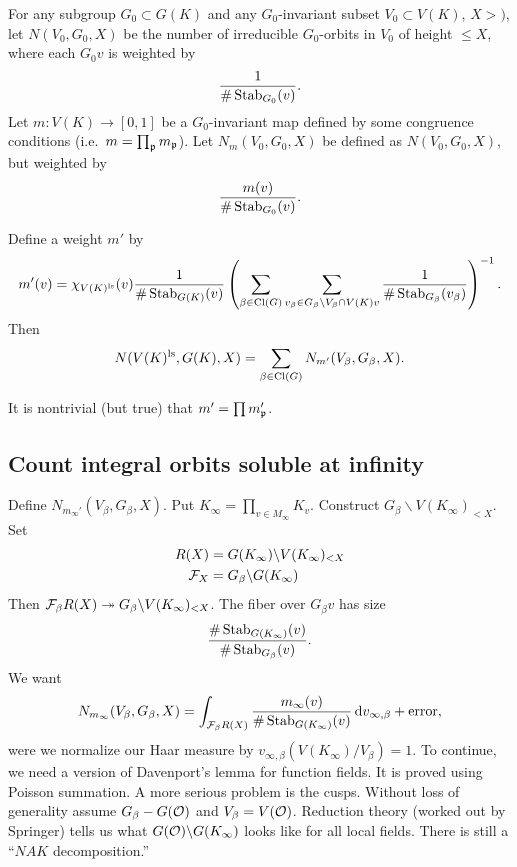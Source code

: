For any subgroup $G_0\subset G(K)$ and any $G_0$-invariant subset 
$V_0\subset V(K)$, $X>)$, let $N(V_0,G_0,X)$ be the number of irreducible 
$G_0$-orbits in $V_0$ of height $\leqslant X$, where each $G_0 v$ is weighted 
by 
\[
  \frac{1}{\#\operatorname{Stab}_{G_0}(v)} .
\]
Let $m:V(K)\to [0,1]$ be a $G_0$-invariant map defined by some congruence 
conditions (i.e.~$m=\prod_{\mathfrak{p}} m_{\mathfrak{p}}$). Let $N_m(V_0,G_0,X)$ be defined as 
$N(V_0,G_0,X)$, but weighted by 
\[
  \frac{m(v)}{\#\operatorname{Stab}_{G_0}(v)} .
\]

\begin{theo}
Define a weight $m'$ by 
\[
  m'(v)=\chi_{V(K)^\mathrm{ls}}(v) \frac{1}{\#\operatorname{Stab}_{G(K)}(v)}\left(\sum_{\beta\in \operatorname{Cl}(G)}\sum_{v_\beta\in G_\beta\backslash V_\beta\cap V(K)v} \frac{1}{\#\operatorname{Stab}_{G_\beta}(v_\beta)}\right)^{-1} .
\]
Then 
\[
  N(V(K)^\mathrm{ls},G(K),X) = \sum_{\beta\in \operatorname{Cl}(G)}N_{m'}(V_\beta,G_\beta,X) . 
\]
\end{theo}

It is nontrivial (but true) that $m' = \prod m'_{\mathfrak{p}}$. 





\subsection{Count integral orbits soluble at infinity}

Define $N_{m_\infty'}(V_\beta,G_\beta,X)$. Put 
$K_\infty = \prod_{v\in M_\infty} K_v$. Construct 
$G_\beta\backslash V(K_\infty)_{<X}$. Set 
\begin{align*}
  R(X) &= G(K_\infty) \backslash V(K_\infty)_{<X} \\
  \mathcal{F}_X &= G_\beta\backslash G(K_\infty) 
\end{align*}
Then $\mathcal{F}_\beta R(X)\twoheadrightarrow G_\beta\backslash V(K_\infty)_{<X}$. The 
fiber over $G_\beta v$ has size 
\[
  \frac{\#\operatorname{Stab}_{G(K_\infty)}(v)}{\#\operatorname{Stab}_{G_\beta}(v)} .
\]
We want 
\[
  N_{m_\infty}(V_\beta,G_\beta,X) = \int_{\mathcal{F}_\beta R(X)} \frac{m_\infty(v)}{\#\operatorname{Stab}_{G(K_\infty)}(v)}\,\mathrm{d} v_{\infty,\beta} + \text{error} ,
\]
were we normalize our Haar measure by 
$v_{\infty,\beta}(V(K_\infty)/V_\beta)=1$. 
To continue, we need a version of Davenport's lemma for function fields. It is 
proved using Poisson summation. A more serious problem is the cusps. Without 
loss of generality assume $G_\beta - G(\mathcal{O})$ and $V_\beta=V(\mathcal{O})$. Reduction 
theory (worked out by Springer) tells us what $G(\mathcal{O})\backslash G(K_\infty)$ 
looks like for all local fields. There is still a ``$NAK$ decomposition.'' 

